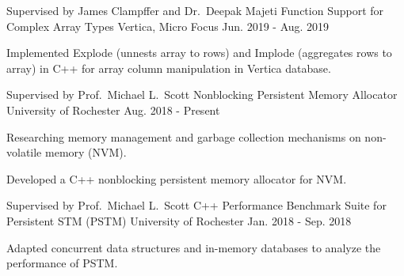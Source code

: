 

\begin{cventries}

  \cventry
    {Supervised by James Clampffer and Dr.\ Deepak Majeti} %
    {Function Support for Complex Array Types} %
    {Vertica, Micro Focus} %
    {Jun. 2019 - Aug. 2019} %
    {
      \begin{cvitems} %
        \item {Implemented Explode (unnests array to rows) and Implode (aggregates rows to array) in C++ for array column manipulation in Vertica database.}
      \end{cvitems}
    }

  \cventry
    {Supervised by Prof.\ Michael L.\ Scott} %
    {Nonblocking Persistent Memory Allocator} %
    {University of Rochester} %
    {Aug. 2018 - Present} %
    {
      \begin{cvitems} %
        \item {Researching memory management and garbage collection mechanisms on non-volatile memory (NVM).}
        \item {Developed a C++ nonblocking persistent memory allocator for NVM.}
      \end{cvitems}
	  }

  \cventry
    {Supervised by Prof.\ Michael L.\ Scott} %
    {C++ Performance Benchmark Suite for Persistent STM (PSTM)} %
    {University of Rochester} %
    {Jan. 2018 - Sep. 2018} %
    {
      \begin{cvitems} %
        \item {Adapted concurrent data structures and in-memory databases to analyze the performance of PSTM.}
      \end{cvitems}
    }


\end{cventries}
